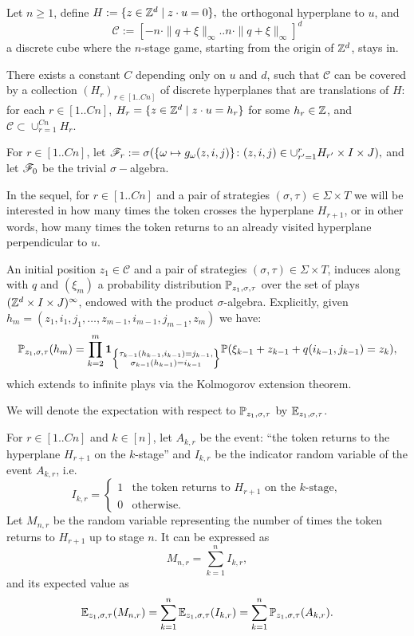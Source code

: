 	Let $n \geq 1$, define $H := \{z \in \mathbb{Z}^d \mid z \cdot u = 0\},$ the orthogonal hyperplane to $u$, and 
	$$\mathscr{C} := [-n\cdot\|q+\xi\|_{\infty}..n\cdot\|q+\xi\|_{\infty}]^d$$ a discrete cube where the $n$-stage game, starting from the origin of $\mathbb{Z}^d$, stays in. 
	
	There exists a constant $C$ depending only on $u$ and $d$, such that $\mathscr{C}$ can be covered by a collection $(H_r)_{r \in [1..Cn]}$ of discrete hyperplanes that are translations of $H$: for each $r \in [1..Cn]$, $H_r = \{z \in \mathbb{Z}^d \mid z \cdot u = h_r\}$ for some $h_r \in \mathbb{Z}$, and $\mathscr{C} \subset \cup_{r = 1}^{Cn}H_r$. 
		
	For $r \in [1..Cn]$, let $\mathscr{F}_r := \sigma(\{\omega \mapsto g_{\omega}(z, i, j)\}\colon (z, i, j) \in \cup_{r' = 1}^{r}H_{r'}\times I \times J),$
	and let $\mathscr{F}_0$ be the trivial $\sigma-$algebra.

	In the sequel, for $r \in [1..Cn]$ and a pair of strategies $(\sigma, \tau) \in \Sigma \times T$ we will be interested in how many times the token crosses the hyperplane $H_{r+1}$, or in other words, how many times the token returns to an already visited hyperplane perpendicular to $u$. 

	An initial position 
	$z_1 \in \mathscr{C}$ and a pair of strategies $(\sigma, \tau) \in \Sigma \times T$, induces along with $q$ and $(\xi_m)$ a probability distribution $\mathbb{P}_{z_1, \sigma, \tau}$ over the set of plays $(\mathbb{Z}^d \times I \times J)^{\infty}$, endowed with the product $\sigma$-algebra. Explicitly, given $h_m = (z_1, i_1, j_1, \ldots, z_{m-1}, i_{m-1}, j_{m-1}, z_m)$ we have:
	\[
		\mathbb{P}_{z_1, \sigma, \tau}(h_m) = \prod_{k = 2}^{m}\mathbf{1}_{\left\{\substack{\tau_{k-1}(h_{k-1}, i_{k-1}) = j_{k-1}, \\ \sigma_{k-1}(h_{k-1}) = i_{k-1}} \right\}}\mathbb{P}(\xi_{k - 1} + z_{k-1} + q(i_{k-1}, j_{k-1}) = z_k),
	\]
	which extends to infinite plays via the Kolmogorov extension theorem.

	We will denote the expectation with respect to $\mathbb{P}_{z_1, \sigma, \tau}$ by $\mathbb{E}_{z_1, \sigma, \tau}$.

	For $r \in [1..Cn]$ and $k \in [n]$, let $A_{k, r}$ be the event: ``the token returns to the hyperplane $H_{r+1}$ on the $k$-stage'' and $I_{k, r}$ be the indicator random variable of the event $A_{k, r}$, i.e.
	\[
		I_{k, r} = \begin{cases}
				1  & \text{the token returns to $H_{r+1}$ on the $k$-stage}, \\
				0  & \text{otherwise}.
			  \end{cases}
	\]
	Let $M_{n, r}$ be the random variable representing the number of times the token returns to $H_{r+1}$ up to stage $n$. It can be expressed as
	\[
		M_{n, r} = \sum_{k = 1}^{n} I_{k, r},
	\]
	and its expected value as 
	\begin{equation}\label{expected-mn}
	\mathbb{E}_{z_1, \sigma, \tau}(M_{n, r}) = \sum_{k = 1}^{n} \mathbb{E}_{z_1, \sigma, \tau}(I_{k, r}) = \sum_{k = 1}^{n} \mathbb{P}_{z_1, \sigma, \tau}(A_{k, r}).
	\end{equation}

